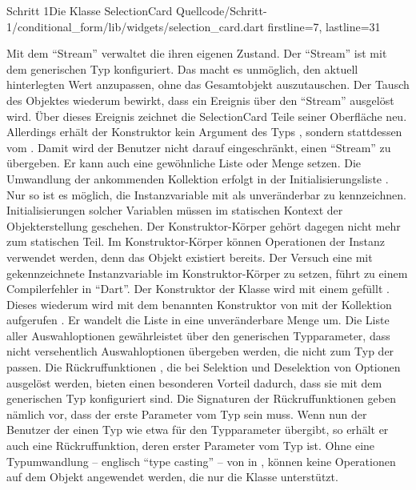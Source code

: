 \begin{alexlisting}{Schritt 1}{Die Klasse SelectionCard}
  {Quellcode/Schritt-1/conditional_form/lib/widgets/selection_card.dart}
  {firstline=7, lastline=31}
  \label{lst:Schritt1KlasseSelectionCard}
\end{alexlisting}

Mit dem \enquote{Stream}  verwaltet die  ihren eigenen Zustand.
Der \enquote{Stream} ist mit dem generischen Typ  konfiguriert.
Das macht es unmöglich, den aktuell hinterlegten Wert anzupassen, ohne das Gesamtobjekt auszutauschen.
Der Tausch des Objektes wiederum bewirkt, dass ein Ereignis über den \enquote{Stream} ausgelöst wird. Über dieses Ereignis zeichnet die SelectionCard Teile seiner Oberfläche neu.
Allerdings erhält der Konstruktor kein Argument des Typs , sondern stattdessen vom  .
Damit wird der Benutzer nicht darauf eingeschränkt, einen \enquote{Stream} zu übergeben.
Er kann auch eine gewöhnliche Liste oder Menge setzen.
Die Umwandlung der ankommenden Kollektion erfolgt in der Initialisierungsliste .
Nur so ist es möglich, die Instanzvariable mit  als unveränderbar zu kennzeichnen.
Initialisierungen solcher Variablen müssen im statischen Kontext der Objekterstellung geschehen.
Der Konstruktor-Körper gehört dagegen nicht mehr zum statischen Teil.
Im Konstruktor-Körper können Operationen der Instanz verwendet werden, denn das Objekt existiert bereits.
Der Versuch eine mit  gekennzeichnete Instanzvariable im Konstruktor-Körper zu setzen, führt zu einem Compilerfehler in \enquote{Dart}.
Der Konstruktor  der Klasse  wird mit einem  gefüllt .
Dieses wiederum wird mit dem benannten Konstruktor  von  mit der Kollektion aufgerufen .
Er wandelt die  Liste in eine unveränderbare Menge um.
Die Liste aller Auswahloptionen   gewährleistet über den generischen Typparameter, dass nicht versehentlich Auswahloptionen übergeben werden, die nicht zum Typ der  passen.
Die Rückruffunktionen , die bei Selektion und Deselektion von Optionen ausgelöst werden, bieten einen besonderen Vorteil dadurch, dass sie mit dem generischen Typ konfiguriert sind.
Die Signaturen der Rückruffunktionen  geben nämlich vor, dass der erste Parameter vom Typ  sein muss.
Wenn nun der Benutzer der  einen Typ wie etwa  für den Typparameter übergibt, so erhält er auch eine Rückruffunktion, deren erster Parameter vom Typ  ist.
Ohne eine Typumwandlung -- englisch \enquote{type casting} -- von  in , können keine Operationen auf dem Objekt angewendet werden, die nur die Klasse  unterstützt.

